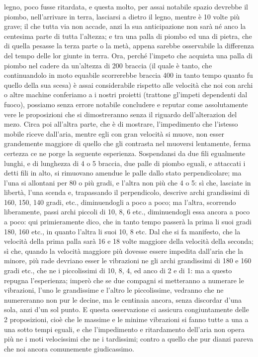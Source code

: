 \documentclass[11pt,twoside,openany]{book}
\begin{document}
legno, poco fusse ritardata, e questa molto, per assai notabile spazio devrebbe il piombo, nell'arrivare in terra, lasciarsi a dietro il legno, mentre è 10 volte più grave; il che tutta via non accade, anzi la sua anticipazione non sarà né anco la centesima parte di tutta l'altezza; e tra una palla di piombo ed una di pietra, che di quella pesasse la terza parte o la metà, appena sarebbe osservabile la differenza del tempo delle lor giunte in terra. Ora, perché l'impeto che acquista una palla di piombo nel cadere da un'altezza di 200 braccia (il quale è tanto, che continuandolo in moto equabile scorrerebbe braccia 400 in tanto tempo quanto fu quello della sua scesa) è assai considerabile rispetto alle velocità che noi con archi o altre machine conferiamo a i nostri proietti (trattone gl'impeti dependenti dal fuoco), possiamo senza errore notabile concludere e reputar come assolutamente vere le proposizioni che si dimostreranno senza il riguardo dell'alterazion del mezo. Circa poi all'altra parte, che è di mostrare, l'impedimento che l'istesso mobile riceve dall'aria, mentre egli con gran velocità si muove, non esser grandemente maggiore di quello che gli contrasta nel muoversi lentamente, ferma certezza ce ne porge la seguente esperienza. Sospendansi da due fili egualmente lunghi, e di lunghezza di 4 o 5 braccia, due palle di piombo eguali, e attaccati i detti fili in alto, si rimuovano amendue le palle dallo stato perpendicolare; ma l'una si allontani per 80 o più gradi, e l'altra non più che 4 o 5: sì che, lasciate in libertà, l'una scenda e, trapassando il perpendicolo, descrive archi grandissimi di 160, 150, 140 gradi, etc., diminuendogli a poco a poco; ma l'altra, scorrendo liberamente, passi archi piccoli di 10, 8, 6 etc., diminuendogli essa ancora a poco a poco: qui primieramente dico, che in tanto tempo passerà la prima li suoi gradi 180, 160 etc., in quanto l'altra li suoi 10, 8 etc. Dal che si fa manifesto, che la velocità della prima palla sarà 16 e 18 volte maggiore della velocità della seconda; sì che, quando la velocità maggiore più dovesse essere impedita dall'aria che la minore, più rade devriano esser le vibrazioni ne gli archi grandissimi di 180 e 160 gradi etc., che ne i piccolissimi di 10, 8, 4, ed anco di 2 e di 1: ma a questo repugna l'esperienza; imperò che se due compagni si metteranno a numerare le vibrazioni, l'uno le grandissime e l'altro le piccolissime, vedranno che ne numereranno non pur le decine, ma le centinaia ancora, senza discordar d'una sola, anzi d'un sol punto. E questa osservazione ci assicura congiuntamente delle 2 proposizioni, cioè che le massime e le minime vibrazioni si fanno tutte a una a una sotto tempi eguali, e che l'impedimento e ritardamento dell'aria non opera più ne i moti velocissimi che ne i tardissimi; contro a quello che pur dianzi pareva che noi ancora comunemente giudicassimo.
\end{document}
